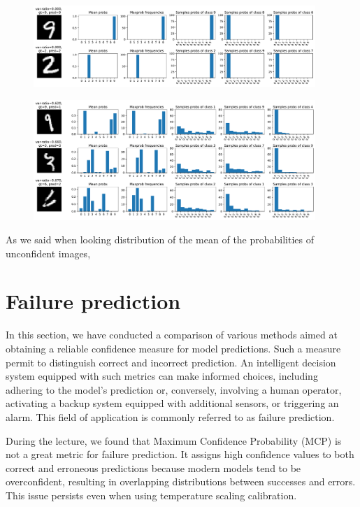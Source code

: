\begin{figure}[H]
    \centering
    \includegraphics[width=0.95\textwidth]{var-ratio_certain_images.pdf}
    \caption{}
    \label{fig:varratio_certain}
\end{figure}
\begin{figure}[H]
    \centering
    \includegraphics[width=0.95\textwidth]{var-ratio_uncertain_images.pdf}
    \caption{}
    \label{fig:varratio_uncertain}
\end{figure}

As we said when looking distribution of the mean of the probabilities of unconfident images, 

\section{Failure prediction}
In this section, we have conducted a comparison of various methods aimed at obtaining a reliable confidence measure for model predictions. Such a measure permit to distinguish correct and incorrect prediction. An intelligent decision system equipped with such metrics can make informed choices, including adhering to the model's prediction or, conversely, involving a human operator, activating a backup system equipped with additional sensors, or triggering an alarm. This field of application is commonly referred to as failure prediction.

During the lecture, we found that Maximum Confidence Probability (MCP) is not a great metric for failure prediction. It assigns high confidence values to both correct and erroneous predictions because modern models tend to be overconfident, resulting in overlapping distributions between successes and errors. This issue persists even when using temperature scaling calibration.

